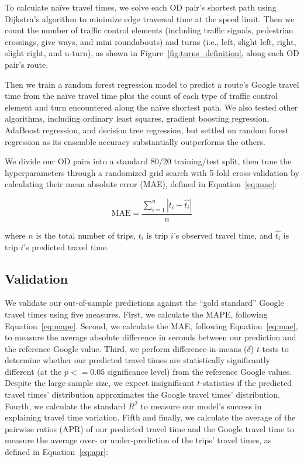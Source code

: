 \documentclass[12pt,letterpaper]{article} %
\begin{document}
To calculate naïve travel times, we solve each OD pair's shortest path using Dijkstra's algorithm to minimize edge traversal time at the speed limit. Then we count the number of traffic control elements (including traffic signals, pedestrian crossings, give ways, and mini roundabouts) and turns (i.e., left, slight left, right, slight right, and u-turn), as shown in Figure~\ref{fig:turns_definition}, along each OD pair's route.

Then we train a random forest regression model to predict a route's Google travel time from  the naïve travel time plus the count of each type of traffic control element and turn encountered along the naïve shortest path. We also tested other algorithms, including ordinary least squares, gradient boosting regression, AdaBoost regression, and decision tree regression, but settled on random forest regression as its ensemble accuracy substantially outperforms the others.

We divide our OD pairs into a standard 80/20 training/test split, then tune the hyperparameters through a randomized grid search with 5-fold cross-validation by calculating their mean absolute error (MAE), defined in Equation~\ref{eq:mae}:

\begin{equation}
\label{eq:mae}
\text{MAE} = \frac{\sum^{n}_{i=1} \left|{t_i - \hat{t_i}}\right|}{n}
\end{equation}

where $n$ is the total number of trips, $t_i$ is trip $i$'s observed travel time, and $\hat{t_i}$ is trip $i$'s predicted travel time.

\subsection{Validation}

We validate our out-of-sample predictions against the \enquote{gold standard} Google travel times using five measures. First, we calculate the MAPE, following Equation~\ref{eq:mape}. Second, we calculate the MAE, following Equation~\ref{eq:mae}, to measure the average absolute difference in seconds between our prediction and the reference Google value. Third, we perform difference-in-means ($\delta$) $t$-tests to determine whether our predicted travel times are statistically significantly different (at the $p<=0.05$ significance level) from the reference Google values. Despite the large sample size, we expect insignificant $t$-statistics if the predicted travel times' distribution approximates the Google travel times' distribution. Fourth, we calculate the standard $R^2$ to measure our model's success in explaining travel time variation. Fifth and finally, we calculate the average of the pairwise ratios (APR) of our predicted travel time and the Google travel time to measure the average over- or under-prediction of the trips' travel times, as defined in Equation~\ref{eq:apr}:
\end{document}
